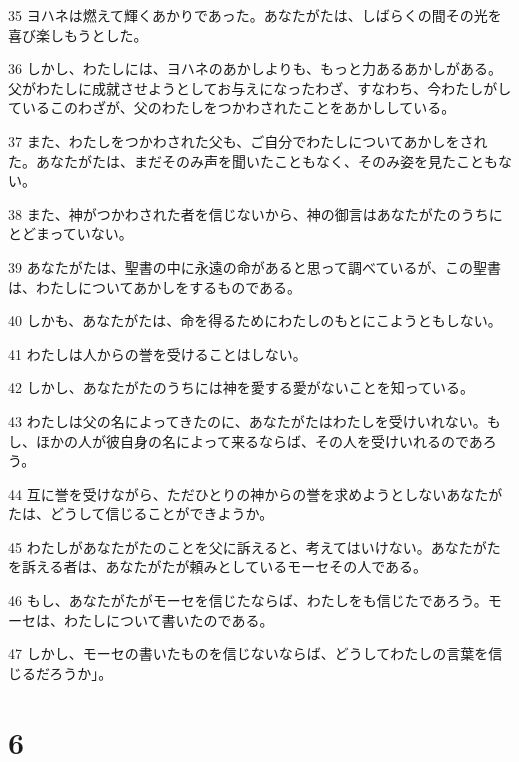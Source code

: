\par 35 ヨハネは燃えて輝くあかりであった。あなたがたは、しばらくの間その光を喜び楽しもうとした。
\par 36 しかし、わたしには、ヨハネのあかしよりも、もっと力あるあかしがある。父がわたしに成就させようとしてお与えになったわざ、すなわち、今わたしがしているこのわざが、父のわたしをつかわされたことをあかししている。
\par 37 また、わたしをつかわされた父も、ご自分でわたしについてあかしをされた。あなたがたは、まだそのみ声を聞いたこともなく、そのみ姿を見たこともない。
\par 38 また、神がつかわされた者を信じないから、神の御言はあなたがたのうちにとどまっていない。
\par 39 あなたがたは、聖書の中に永遠の命があると思って調べているが、この聖書は、わたしについてあかしをするものである。
\par 40 しかも、あなたがたは、命を得るためにわたしのもとにこようともしない。
\par 41 わたしは人からの誉を受けることはしない。
\par 42 しかし、あなたがたのうちには神を愛する愛がないことを知っている。
\par 43 わたしは父の名によってきたのに、あなたがたはわたしを受けいれない。もし、ほかの人が彼自身の名によって来るならば、その人を受けいれるのであろう。
\par 44 互に誉を受けながら、ただひとりの神からの誉を求めようとしないあなたがたは、どうして信じることができようか。
\par 45 わたしがあなたがたのことを父に訴えると、考えてはいけない。あなたがたを訴える者は、あなたがたが頼みとしているモーセその人である。
\par 46 もし、あなたがたがモーセを信じたならば、わたしをも信じたであろう。モーセは、わたしについて書いたのである。
\par 47 しかし、モーセの書いたものを信じないならば、どうしてわたしの言葉を信じるだろうか」。

\chapter{6}

